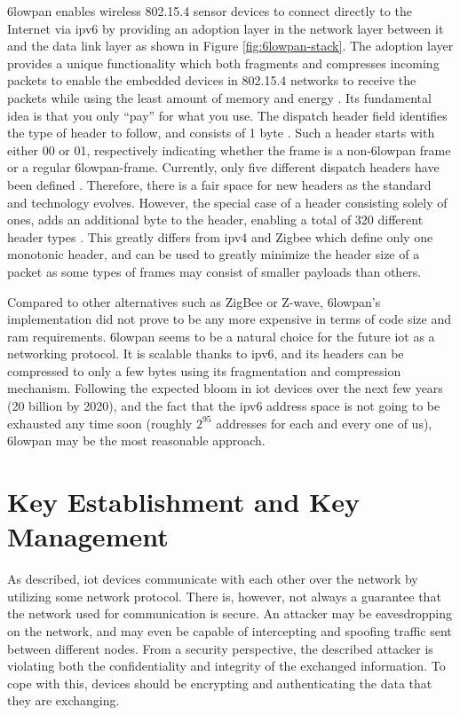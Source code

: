 \gls{6lowpan} enables wireless 802.15.4 sensor devices to connect directly to the Internet via \gls{ip}v6 by providing an adoption layer in the network layer between it and the data link layer as shown in Figure \ref{fig:6lowpan-stack}. The adoption layer provides a unique functionality which both fragments and compresses incoming packets to enable the embedded devices in 802.15.4 networks to receive the packets while using the least amount of memory and energy \cite{krentz20136lowpan}. Its fundamental idea is that you only ``pay'' for what you use. The dispatch header field identifies the type of header to follow, and consists of 1 byte \citep{Mulligan2007}. Such a header starts with either 00 or 01, respectively indicating whether the frame is a non-\gls{6lowpan} frame or a regular \gls{6lowpan}-frame. Currently, only five different dispatch headers have been defined \cite{rfc6282}. Therefore, there is a fair space for new headers as the standard and technology evolves. However, the special case of a header consisting solely of ones, adds an additional byte to the header, enabling a total of 320 different header types \citep{Mulligan2007}. This greatly differs from \gls{ip}v4 and Zigbee which define only one monotonic header, and can be used to greatly minimize the header size of a packet as some types of frames may consist of smaller payloads than others.


Compared to other alternatives such as ZigBee or Z-wave, \gls{6lowpan}'s implementation did not prove to be any more expensive in terms of code size and \gls{ram} requirements. \gls{6lowpan} seems to be a natural choice for the future \gls{iot} as a networking protocol. It is scalable thanks to \gls{ip}v6, and its headers can be compressed to only a few bytes using its fragmentation and compression mechanism. Following the expected bloom in \gls{iot} devices over the next few years (20 billion by 2020), and the fact that the \gls{ip}v6 address space is not going to be exhausted any time soon (roughly $2^{95}$ addresses for each and every one of us), \gls{6lowpan} may be the most reasonable approach.

\section{Key Establishment and Key Management}
\label{sec:keyestablishment}

As described, \gls{iot} devices communicate with each other over the network by utilizing some network protocol. There is, however, not always a guarantee that the network used for communication is secure. An attacker may be eavesdropping on the network, and may even be capable of intercepting and spoofing traffic sent between different nodes. From a security perspective, the described attacker is violating both the confidentiality and integrity of the exchanged information. To cope with this, devices should be encrypting and authenticating the data that they are exchanging. 


